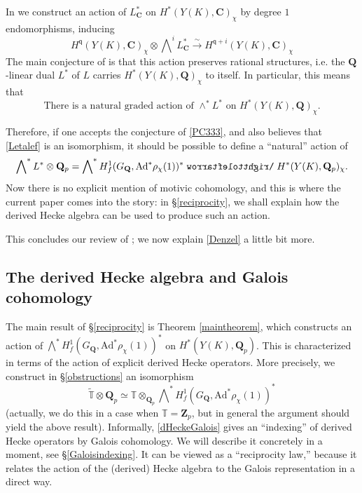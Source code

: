 \documentclass[10pt]{amsart}
\def\acts{\mathrel{\reflectbox{$\righttoleftarrow$}}}
\newcommand{\Z}{\mathbf{Z}}
\newcommand{\Ad}{\mathrm{Ad}}
\newcommand{\gHecke}{\tilde{\mathbb{T}}}
\newcommand{\Q}{\mathbf{Q}}
\newcommand{\C}{\mathbf{C}}
\theoremstyle{remark}
\newcommand{\BWq}{\mathsf{q}}
\begin{document}
 In \cite{PV} we construct an action of $L_{\C}^*$ on $H^*(Y(K), \C)_{\chi}$ by degree $1$ endomorphisms, inducing
\begin{equation} \label{PVc}  H^{\BWq}(Y(K), \C)_{\chi}  \otimes \bigwedge \nolimits^i L_{\C}^* \stackrel{\sim}{\longrightarrow}
 H^{\BWq+i}(Y(K), \C)_{\chi} \end{equation}  
The main conjecture of \cite{PV} is that this action preserves rational structures, i.e.  the $\Q$-linear dual $L^*$  of $L$ carries
$H^*(Y(K), \Q)_{\chi}$  to itself.  In particular, this  means that 
\begin{equation} \label{PC333} \mbox{There is a natural graded  action of $\wedge^* L^*$ on $H^*(Y(K), \Q)_{\chi}$.}
\end{equation}



%
%
%
%
%
%
%
%
%
%
%
%
%
%
Therefore, if  one accepts the conjecture 
of \eqref{PC333},  and also believes that \eqref{Letalef} is an isomorphism, it should be possible to 
define a ``natural''
action of \begin{equation} \label{Denzel} \bigwedge \nolimits^* L^* \otimes \Q_p = \bigwedge \nolimits^* H^1_f(G_{\Q}, \Ad^* \rho_{\chi}(1))^*
\acts H^*(Y(K), \Q_p)_{\chi}.
\end{equation}
 Now there is no explicit mention of motivic cohomology, and 
this is where the current paper comes into the story:
in   \S \ref{reciprocity}, we shall explain how the derived Hecke algebra 
   can be used  to produce
such an action.   

This concludes our review of \cite{PV}; we now explain \eqref{Denzel}  a little bit more. 

%
%
%
%
%
%
%
%
%
%
%
 

  
  
  \subsection{The derived Hecke algebra and Galois cohomology} \label{reindexing}
  
  The main result  of \S \ref{reciprocity} is Theorem \ref{maintheorem}, which constructs  
  an action of 
$   \bigwedge \nolimits^* H^1_f(G_{\Q}, \Ad^* \rho_{\chi}(1))^*$
   on $H^*(Y(K), \Q_p)$.   This is characterized
  in terms of the action of explicit derived Hecke operators. 
   More precisely,    we construct in \S \ref{obstructions} an isomorphism
\begin{equation} \label{dHeckeGalois} \gHecke \otimes \Q_p \simeq \mathbb{T} \otimes_{\Q_p} 
 \bigwedge \nolimits^* H^1_f(G_{\Q}, \Ad^* \rho_{\chi}(1))^*\end{equation}
 (actually, we do this in a case when $\mathbb{T}=\Z_p$, but  in general the argument  should yield the above result). 
  Informally, \eqref{dHeckeGalois}
gives an  ``indexing''  of derived Hecke operators by Galois cohomology. We will describe it concretely in a moment,  see \S \ref{Galoisindexing}. It can be viewed as a ``reciprocity law,''
because it relates the action of the (derived) Hecke algebra to the Galois representation in a direct way. 
\end{document}
